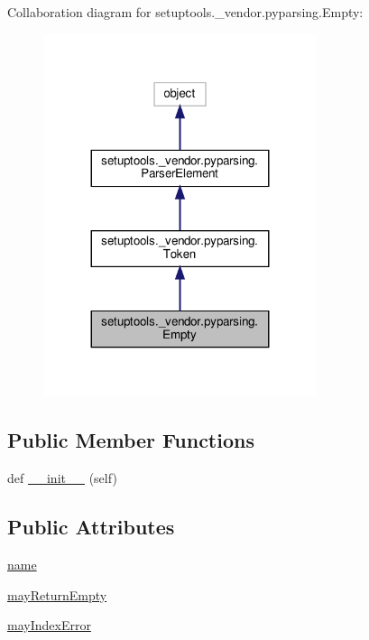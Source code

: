 Collaboration diagram for setuptools.\+\_\+vendor.\+pyparsing.\+Empty\+:
\nopagebreak
\begin{figure}[H]
\begin{center}
\leavevmode
\includegraphics[width=227pt]{classsetuptools_1_1__vendor_1_1pyparsing_1_1Empty__coll__graph}
\end{center}
\end{figure}
\subsection*{Public Member Functions}
\begin{DoxyCompactItemize}
\item 
def \hyperlink{classsetuptools_1_1__vendor_1_1pyparsing_1_1Empty_a703b5a8a25b893abaee8efba515447ae}{\+\_\+\+\_\+init\+\_\+\+\_\+} (self)
\end{DoxyCompactItemize}
\subsection*{Public Attributes}
\begin{DoxyCompactItemize}
\item 
\hyperlink{classsetuptools_1_1__vendor_1_1pyparsing_1_1Empty_aea859e714663ba5714a0de67f63f6635}{name}
\item 
\hyperlink{classsetuptools_1_1__vendor_1_1pyparsing_1_1Empty_a8a9d4830850f2dd7112bba33f20afa9c}{may\+Return\+Empty}
\item 
\hyperlink{classsetuptools_1_1__vendor_1_1pyparsing_1_1Empty_a4c35fde0f15a14a91273efac7973c400}{may\+Index\+Error}
\end{DoxyCompactItemize}
